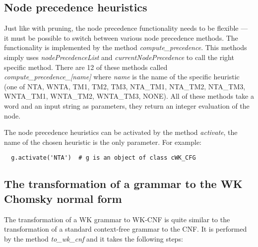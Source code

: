 \subsection{Node precedence heuristics}
Just like with pruning, the node precedence functionality needs to be flexible --- it must be possible to switch between various node precedence methods. The functionality is implemented by the method \textit{compute\_precedence}. This methods simply uses \textit{nodePrecedenceList} and \textit{currentNodePrecedence} to call the right specific method.
There are 12 of these methods called \textit{compute\_precedence\_[name]} where \textit{name} is the name of the specific heuristic (one of NTA, WNTA, TM1, TM2, TM3, NTA\_TM1, NTA\_TM2, NTA\_TM3, WNTA\_TM1, WNTA\_TM2, WNTA\_TM3, NONE). All of these methods take a word and an input string as parameters, they return an integer evaluation of the node.

The node precedence heuristics can be activated by the method \textit{activate}, the name of the chosen heuristic is the only parameter. For example:

\begin{verbatim}
  g.activate('NTA')  # g is an object of class cWK_CFG
\end{verbatim}

\subsection{The transformation of a grammar to the WK Chomsky normal form}
The transformation of a WK grammar to WK-CNF is quite similar to the transformation of a standard context-free grammar to the CNF. It is performed by the method \textit{to\_wk\_cnf} and it takes the following steps:

